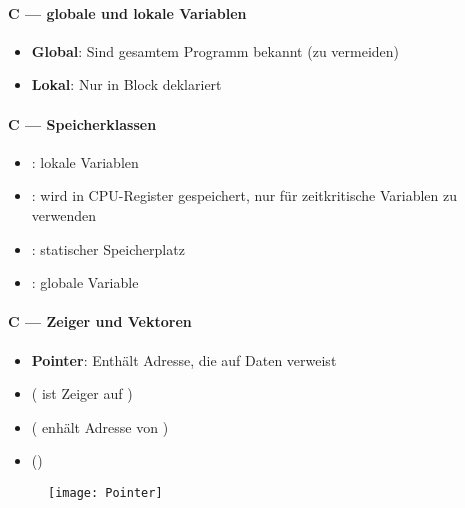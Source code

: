 \paragraph{C --- globale und lokale Variablen}
\begin{itemize}
  \item \textbf{Global}: Sind gesamtem Programm bekannt (zu vermeiden)
  \item \textbf{Lokal}: Nur in Block deklariert
\end{itemize}

\paragraph{C --- Speicherklassen}
\begin{itemize}
  \item \textbf{}: lokale Variablen
  \item \textbf{}: wird in CPU-Register gespeichert, nur für zeitkritische Variablen zu verwenden
  \item \textbf{}: statischer Speicherplatz
  \item \textbf{}: globale Variable
\end{itemize}

\paragraph{C --- Zeiger und Vektoren}
\begin{itemize}
  \item \textbf{Pointer}: Enthält Adresse, die auf Daten verweist
  \item {} ( ist Zeiger auf )
  \item {} ( enhält Adresse von )
  \item {} ()
\end{itemize}
\begin{figure}[ht]
  \centering
  \texttt{[image: Pointer]}
\end{figure}